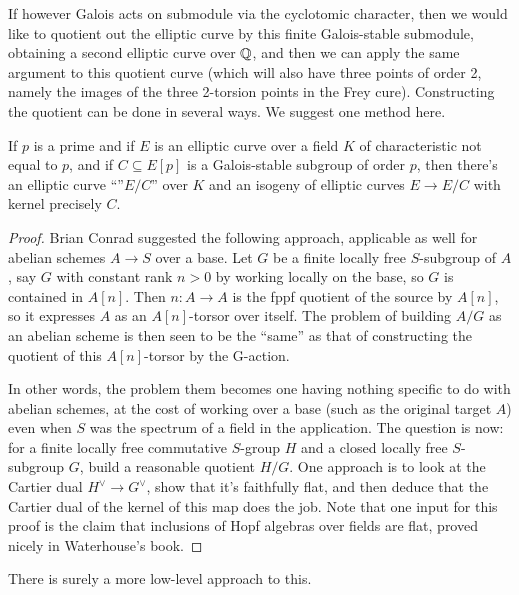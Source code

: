 If however Galois acts on submodule via the cyclotomic character, then we would like
to quotient out the elliptic curve by this finite Galois-stable submodule, obtaining a second
elliptic curve over $\mathbb{Q}$, and then we can apply
the same argument to this quotient curve (which will also have three points of order 2, namely
the images of the three 2-torsion points in the Frey cure). Constructing the quotient
can be done in several ways. We suggest one method here.

\begin{theorem}\label{Elliptic_curve_quotient_by_finite_subgroup} If $p$ is a prime and
  if $E$ is an elliptic curve over a field $K$ of characteristic not equal to $p$,
   and if $C\subseteq E[p]$ is a Galois-stable
  subgroup of order $p$, then there's an elliptic curve ``''$E/C$'' over $K$ and an isogeny of elliptic curves $E\to E/C$ with kernel precisely $C$.
\end{theorem}
\begin{proof}
  Brian Conrad suggested the following approach, applicable as well for abelian schemes $A\to S$ over a base.  Let $G$ be a finite locally free $S$-subgroup of $A$, say $G$ with constant rank $n > 0$ by working locally on the base, so $G$ is contained in $A[n]$.  Then $n: A \to A$ is the fppf quotient of the source by $A[n]$, so it expresses $A$ as an $A[n]$-torsor over itself.  The problem of building $A/G$ as an abelian scheme is then seen to be the “same” as that of constructing the quotient of this $A[n]$-torsor by the G-action.

  In other words, the problem them becomes one having nothing specific to do with abelian schemes, at the cost of working over a base (such as the original target $A$) even when $S$ was the spectrum of a field in the application. The question is now: for a finite locally free commutative $S$-group $H$ and a closed locally free $S$-subgroup $G$, build a reasonable quotient $H/G$. One approach is to look at the Cartier dual $H^\vee\to G^\vee$, show that it's faithfully flat, and then deduce that the Cartier dual of the kernel of this map does the job. Note that one input for this proof is the claim that inclusions of Hopf algebras over fields are flat, proved nicely in Waterhouse’s book.
\end{proof}

There is surely a more low-level approach to this.

